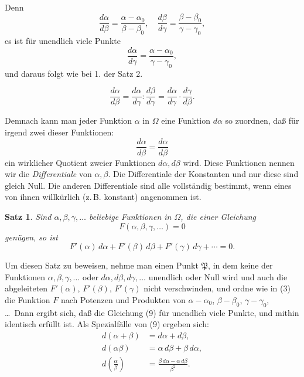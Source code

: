 \documentclass[12pt,a4paper]{article}
\newtheorem*{satz}{Satz}
\begin{document}
Denn
\[
\frac{d\alpha}{d\beta} = \frac{\alpha - \alpha_0}{\beta - \beta_0}, \quad \frac{d\beta}{d\gamma} = \frac{\beta - \beta_0}{\gamma - \gamma_0},
\]
es ist für unendlich viele Punkte
\[
\frac{d\alpha}{d\gamma} = \frac{\alpha - \alpha_0}{\gamma - \gamma_0},
\]
und daraus folgt wie bei 1. der Satz 2.

\begin{equation}\label{eq:194-7}
\frac{d\alpha}{d\beta} = \frac{d\alpha}{d\gamma} : \frac{d\beta}{d\gamma} = \frac{d\alpha}{d\gamma} \cdot \frac{d\gamma}{d\beta}.
\end{equation}

Demnach kann man jeder Funktion $\alpha$ in $\Omega$ eine Funktion $d\alpha$ so zuordnen, daß für irgend zwei dieser Funktionen:
\begin{equation}\label{eq:194-8}
\frac{d\alpha}{d\beta} = \frac{d\alpha}{d\beta}
\end{equation}
ein wirklicher Quotient zweier Funktionen $d\alpha, d\beta$ wird. Diese Funktionen nennen wir die \emph{Differentiale} von $\alpha, \beta$. Die Differentiale der Konstanten und nur diese sind gleich Null. Die anderen Differentiale sind alle vollständig bestimmt, wenn eines von ihnen willkürlich (z.\,B. konstant) angenommen ist.

\begin{satz}
Sind $\alpha, \beta, \gamma, \ldots$ beliebige Funktionen in $\Omega$, die einer Gleichung
\begin{equation}\label{eq:194-9}
F(\alpha, \beta, \gamma, \ldots) = 0
\end{equation}
genügen, so ist
\begin{equation}\label{eq:194-10}
F'(\alpha)\,d\alpha + F'(\beta)\,d\beta + F'(\gamma)\,d\gamma + \cdots = 0.
\end{equation}
\end{satz}

Um diesen Satz zu beweisen, nehme man einen Punkt $\mathfrak{P}$, in dem keine der Funktionen $\alpha, \beta, \gamma, \ldots$ oder $d\alpha, d\beta, d\gamma, \ldots$ unendlich oder Null wird und auch die abgeleiteten $F'(\alpha)$, $F'(\beta)$, $F'(\gamma)$ nicht verschwinden, und ordne wie in (3) die Funktion $F$ nach Potenzen und Produkten von $\alpha - \alpha_0$, $\beta - \beta_0$, $\gamma - \gamma_0$, \ldots\ Dann ergibt sich, daß die Gleichung (9) für unendlich viele Punkte, und mithin identisch erfüllt ist. Als Spezialfälle von (9) ergeben sich:
\begin{equation}\label{eq:194-11}
\begin{aligned}
d(\alpha + \beta) &= d\alpha + d\beta,\\
d(\alpha\beta) &= \alpha\,d\beta + \beta\,d\alpha,\\
d\left(\frac{\alpha}{\beta}\right) &= \frac{\beta\,d\alpha - \alpha\,d\beta}{\beta^2}.
\end{aligned}
\end{equation}
\end{document}
